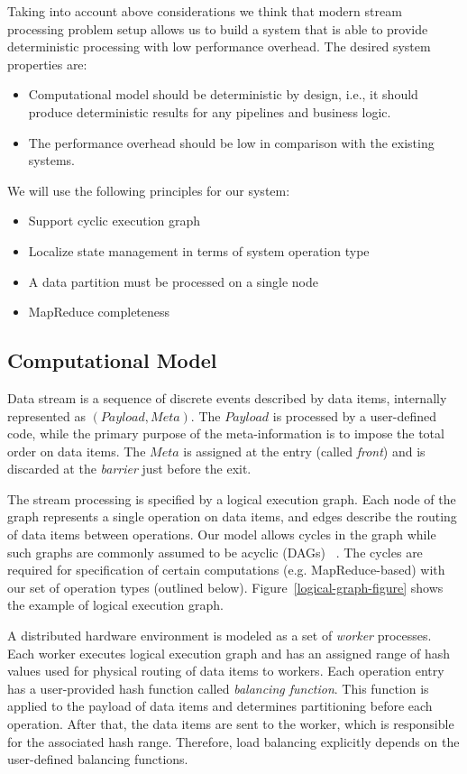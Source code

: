 Taking into account above considerations we think that modern stream processing problem setup allows us to build a system that is able to provide deterministic processing with low performance overhead. The desired system properties are:
\begin{itemize}
  \item Computational model should be deterministic by design, i.e., it should produce deterministic results for any pipelines and business logic.
  \item The performance overhead should be low in comparison with the existing systems.
\end{itemize}
We will use the following principles for our system:
\begin{itemize}
  \item Support cyclic execution graph
  \item Localize state management in terms of system operation type
  \item A data partition must be processed on a single node
  \item MapReduce completeness
\end{itemize}

\subsection {Computational Model}
\label{model-section}

Data stream is a sequence of discrete events described by data items, internally represented as $(Payload, Meta)$. The $Payload$ is processed by a user-defined code, while the primary purpose of the meta-information is to impose the total order on data items. The $Meta$ is assigned at the entry (called {\em front}) and is discarded at the {\em barrier} just before the exit. 

The stream processing is specified by a logical execution graph. Each node of the graph represents a single operation on data items, and edges describe the routing of data items between operations. Our model allows cycles in the graph while such graphs are commonly assumed to be acyclic (DAGs) ~\cite{Zaharia:2016:ASU:3013530.2934664, Carbone:2017:SMA:3137765.3137777}. The cycles are required for specification of certain computations (e.g. MapReduce-based) with our set of operation types (outlined below). Figure~\ref{logical-graph-figure} shows the example of logical execution graph.

A distributed hardware environment is modeled as a set of {\em worker} processes. Each worker executes logical execution graph and has an assigned range of hash values used for physical routing of data items to workers. Each operation entry has a user-provided hash function called {\it balancing function}. This function is applied to the payload of data items and determines partitioning before each operation. After that, the data items are sent to the worker, which is responsible for the associated hash range. Therefore, load balancing explicitly depends on the user-defined balancing functions. 

